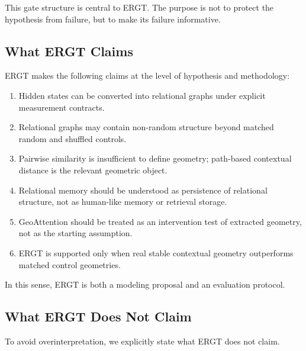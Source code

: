 \documentclass[11pt]{article}
\begin{document}
This gate structure is central to ERGT. The purpose is not to protect the hypothesis from failure, but to make its failure informative.

\subsection{What ERGT Claims}

ERGT makes the following claims at the level of hypothesis and methodology:

\begin{enumerate}[leftmargin=2em]
    \item Hidden states can be converted into relational graphs under explicit measurement contracts.
    \item Relational graphs may contain non-random structure beyond matched random and shuffled controls.
    \item Pairwise similarity is insufficient to define geometry; path-based contextual distance is the relevant geometric object.
    \item Relational memory should be understood as persistence of relational structure, not as human-like memory or retrieval storage.
    \item GeoAttention should be treated as an intervention test of extracted geometry, not as the starting assumption.
    \item ERGT is supported only when real stable contextual geometry outperforms matched control geometries.
\end{enumerate}

In this sense, ERGT is both a modeling proposal and an evaluation protocol.

\subsection{What ERGT Does Not Claim}

To avoid overinterpretation, we explicitly state what ERGT does not claim.
\end{document}
